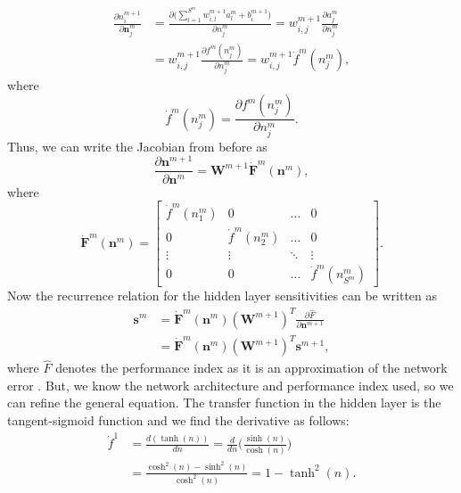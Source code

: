 \documentclass[12pt,halfline,a4paper]{ouparticle}
\begin{document}
\begin{equation}
\begin{split}
\frac{\partial n^{m+1}_{i}}{\partial \mathbf{n}^{m}_{j}} &= \frac{\partial \bigg(\sum_{l=1}^{S^{m}} w_{i, l}^{m+1}a_{l}^{m} + b_{i}^{m+1}\bigg)}{\partial n_{j}^{m}} = w_{i, j}^{m+1} \frac{\partial a_{j}^{m}}{\partial n_{j}^{m}} \\
&= w_{i, j}^{m+1} \frac{\partial f^{m}(n_{j}^{m})}{\partial n_{j}^{m}} = w_{i, j}^{m+1} \dot{f}^{m}(n_{j}^{m}) ,  
\end{split}
\end{equation}
where 
\begin{equation}
\dot{f}^{m}(n_{j}^{m}) = \frac{\partial f^{m}(n_{j}^{m})}{\partial n_{j}^{m}}.
\end{equation}
Thus, we can write the Jacobian from before as 
\begin{equation}
\frac{\partial \mathbf{n}^{m+1}}{\partial \mathbf{n}^{m}} = \mathbf{W}^{m+1} \dot{\mathbf{F}}^{m}(\mathbf{n}^{m}), 
\end{equation}
where 
\begin{equation}
\dot{\mathbf{F}}^{m}(\mathbf{n}^{m}) = \begin{bmatrix} \dot{f}^{m}(n_{1}^{m}) & 0 & \ldots & 0 \\ 
0 & \dot{f}^{m}(n_{2}^{m}) & \ldots & 0 \\
\vdots & \vdots & \ddots & \vdots \\ 
0 & 0 & \ldots & \dot{f}^{m}(n_{S^{m}}^{m}) \end{bmatrix}.
\end{equation}
Now the recurrence relation for the hidden layer sensitivities can be written as 
\begin{equation}
\begin{split}
\mathbf{s}^{m} & = \dot{\mathbf{F}}^{m}(\mathbf{n}^{m})(\mathbf{W}^{m+1})^{T}\frac{\partial \hat{F}}{\partial \mathbf{n}^{m+1}} \\
& = \dot{\mathbf{F}}^{m}(\mathbf{n}^{m})(\mathbf{W}^{m+1})^{T}\mathbf{s}^{m+1},
\end{split}
\end{equation}
where $\hat{F}$ denotes the performance index as it is an approximation of the network error \cite{hagan2014}. But, we know the network architecture and performance index used, so we can refine the general equation. The transfer function in the hidden layer is the tangent-sigmoid function and we find the derivative as follows: 
\begin{equation}
\begin{split}
\dot{f}^{1} & = \frac{d(\tanh(n))}{dn} = \frac{d}{dn}\bigg(\frac{\sinh(n)}{\cosh(n)}\bigg) \\
 & = \frac{\cosh^{2}(n) - \sinh^{2}(n)}{\cosh^{2}(n)} = 1 - \tanh^{2}(n). 
\end{split}
\end{equation}
\end{document}
